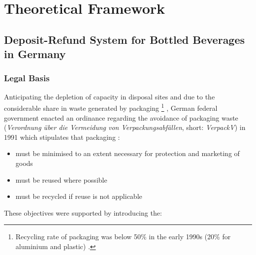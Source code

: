 
\chapter{Theoretical Framework}
\label{chp:theoreticalFramework}

\section{Deposit-Refund System for Bottled Beverages in Germany}
\subsection{Legal Basis}
\label{sec:legalBasis}
Anticipating the depletion of capacity in disposal sites and due to the considerable share in waste generated by packaging \footnote{Recycling rate of packaging was below 50\% in the early 1990s (20\% for aluminium and plastic)  \cite[p.~2]{Hartlep2011Recycling}.} \cite[p.~2]{Hartlep2011Recycling}, German federal government enacted an ordinance regarding the avoidance of packaging waste (\textit{Verordnung über die Vermeidung von Verpackungsabfällen}, short: \textit{\ac{VerpackV}}) in 1991 which stipulates that packaging \cite[§~1]{verpackV1991}:

\begin{itemize}
  \item must be minimised to an extent necessary for protection and marketing of goods
  \item must be reused where possible
  \item must be recycled if reuse is not applicable 
\end{itemize}

These objectives were supported by introducing the:

